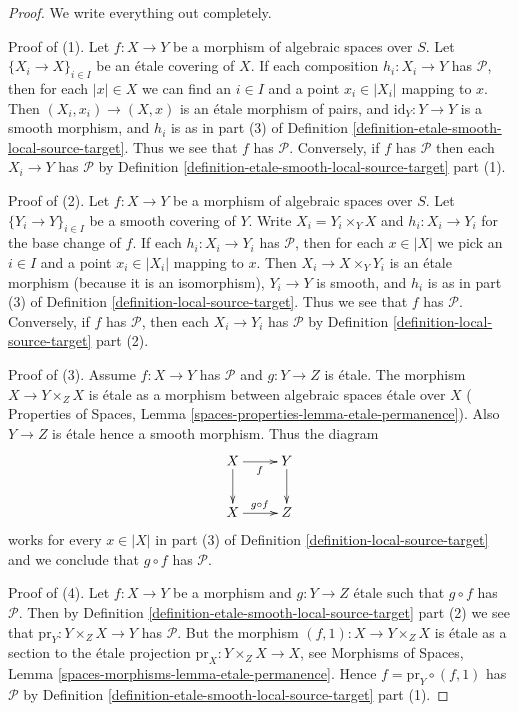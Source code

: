 \documentclass{stacks-project}
\theoremstyle{plain}
\theoremstyle{definition}
\theoremstyle{remark}
\numberwithin{equation}{subsection}
\begin{document}
\begin{proof}
We write everything out completely.

\medskip\noindent
Proof of (1). Let $f : X \to Y$ be a morphism of algebraic spaces over $S$.
Let $\{X_i \to X\}_{i \in I}$ be an \'etale covering of $X$. If each composition
$h_i : X_i \to Y$ has $\mathcal{P}$, then for each $|x| \in X$ we can find
an $i \in I$ and a point $x_i \in |X_i|$ mapping to $x$. Then
$(X_i, x_i) \to (X, x)$ is an \'etale morphism of pairs, and
$\text{id}_Y : Y \to Y$ is a smooth morphism, and $h_i$ is as in part (3) of
Definition \ref{definition-etale-smooth-local-source-target}.
Thus we see that $f$ has $\mathcal{P}$.
Conversely, if $f$ has $\mathcal{P}$ then each $X_i \to Y$ has
$\mathcal{P}$ by
Definition \ref{definition-etale-smooth-local-source-target} part (1).

\medskip\noindent
Proof of (2). Let $f : X \to Y$ be a morphism of algebraic spaces over $S$.
Let $\{Y_i \to Y\}_{i \in I}$ be a smooth covering of $Y$.
Write $X_i = Y_i \times_Y X$ and $h_i : X_i \to Y_i$ for the base change
of $f$. If each  $h_i : X_i \to Y_i$ has $\mathcal{P}$, then for each
$x \in |X|$ we pick an $i \in I$ and a point $x_i \in |X_i|$ mapping to $x$.
Then $X_i \to X \times_Y Y_i$ is an \'etale morphism
(because it is an isomorphism), $Y_i \to Y$ is
smooth, and $h_i$ is as in part (3) of
Definition \ref{definition-local-source-target}.
Thus we see that $f$ has $\mathcal{P}$.
Conversely, if $f$ has $\mathcal{P}$, then each $X_i \to Y_i$ has
$\mathcal{P}$ by
Definition \ref{definition-local-source-target} part (2).

\medskip\noindent
Proof of (3). Assume $f : X \to Y$ has $\mathcal{P}$ and $g : Y \to Z$ is
\'etale. The morphism $X \to Y \times_Z X$ is \'etale as a morphism
between algebraic spaces \'etale over $X$ (
Properties of Spaces, Lemma \ref{spaces-properties-lemma-etale-permanence}).
Also $Y \to Z$ is \'etale hence a smooth morphism.
Thus the diagram
$$
\xymatrix{
X \ar[d] \ar[r]_f & Y \ar[d] \\
X \ar[r]^{g \circ f} & Z
}
$$
works for every $x \in |X|$ in part (3) of
Definition \ref{definition-local-source-target}
and we conclude that $g \circ f$ has $\mathcal{P}$.

\medskip\noindent
Proof of (4). Let $f : X \to Y$ be a morphism and $g : Y \to Z$ \'etale
such that $g \circ f$ has $\mathcal{P}$. Then by
Definition \ref{definition-etale-smooth-local-source-target} part (2)
we see that $\text{pr}_Y : Y \times_Z X \to Y$ has $\mathcal{P}$. But
the morphism $(f, 1) : X \to Y \times_Z X$ is \'etale as a section to the
\'etale projection $\text{pr}_X : Y \times_Z X \to X$, see
Morphisms of Spaces, Lemma \ref{spaces-morphisms-lemma-etale-permanence}.
Hence $f = \text{pr}_Y \circ (f, 1)$ has $\mathcal{P}$ by
Definition \ref{definition-etale-smooth-local-source-target} part (1).
\end{proof}
\end{document}
